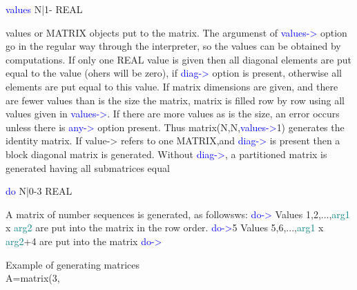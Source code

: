 \vspace{0.3cm}
\hline
\vspace{0.3cm}
\noindent \textcolor{blue}{values} \tabto{3cm} N|1- \tabto{5cm}   REAL  \tabto{7cm}
\begin{changemargin}{3cm}{0cm}
\noindent values or MATRIX objects put to the matrix. The argumenst of
\textcolor{blue}{values->} option go in the regular way
through the interpreter, so the values can be obtained by computations. If only one REAL value is
given then all diagonal elements are put equal to the value (ohers will be zero),
if \textcolor{blue}{diag->} option is present, otherwise all elements are put equal to this value. If matrix dimensions
are given, and there are fewer values than is the size the matrix, matrix is
filled row by row using all values given in
\textcolor{blue}{values->}. If there are more values as is the size, an error occurs unless there is
\textcolor{blue}{any->} option present.
Thus \textcolor{VioletRed}{matrix}(N,N,\textcolor{blue}{values->}1) generates the identity matrix.
If value-> refers to one MATRIX,and \textcolor{blue}{diag->} is present then a block diagonal
matrix is generated. Without \textcolor{blue}{diag->}, a partitioned matrix is generated having all
submatrices equal
\end{changemargin}
\vspace{0.3cm}
\hline
\vspace{0.3cm}
\noindent \textcolor{blue}{do}  \tabto{3cm} N|0-3 \tabto{5cm}  REAL   \tabto{7cm}
\begin{changemargin}{3cm}{0cm}
\noindent  A matrix of number sequences is generated, as followsws: \newline
\textcolor{blue}{do->} Values 1,2,...,\textcolor{teal}{arg1} x \textcolor{teal}{arg2} are put into the matrix in the row order. \newline
\textcolor{blue}{do->}5 Values 5,6,...,\textcolor{teal}{arg1} x \textcolor{teal}{arg2}+4 are put into the matrix \newline
\textcolor{blue}{do->}
\end {changemargin}
\hline
\vspace{0.2cm}
\begin{example}[matrixex]Example of generating matrices\\
\label{matrixex}
A=\textcolor{VioletRed}{matrix}(3,
\end{example}
